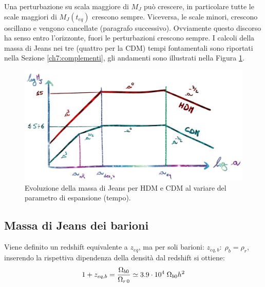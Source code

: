 Una perturbazione su scala maggiore di $M_J$ può crescere, in particolare tutte le scale maggiori di $M_J(t_{eq})$ crescono sempre. Viceversa, le scale minori, crescono oscillano e  vengono cancellate (paragrafo successivo). Ovviamente questo discorso ha senso entro l'orizzonte, fuori le perturbazioni crescono sempre. I calcoli della massa di Jeans nei tre (quattro per la CDM) tempi fontamentali sono riportati nella Sezione \ref{ch7:complementi}, gli andamenti sono illustrati nella Figura \ref{fig7:mjhotncold}.

\begin{figure}[H]
    \centering
    \includegraphics[width=.88 \textwidth]{Pictures/7/mjhotncold.jpg}
    \caption{Evoluzione della massa di Jeans per HDM e CDM al variare del parametro di espansione (tempo).}\label{fig7:mjhotncold}
\end{figure}

\subsection{Massa di Jeans dei barioni}
Viene definito un redshift equivalente a $z_{eq}$, ma per soli barioni: $z_{eq,b}: \; \rho_b=\rho_r$, inserendo la rispettiva dipendenza della densità dal redshift si ottiene:
\begin{equation}
    1+z_{eq,b}=\frac{\Omega_{b0}}{\Omega_{r\, 0}}\simeq 3.9\cdot 10^4\; \Omega_{b0} h^2
\end{equation}

